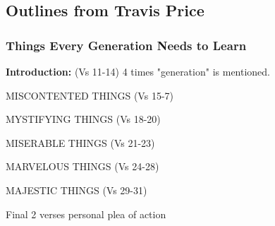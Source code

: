 \subsection{Outlines from Travis Price}


\subsubsection{Things Every Generation Needs to Learn}


\noindent  \textbf{Introduction: } (Vs 11-14) 4 times "generation" is mentioned.\\

\begin{compactenum}[I.]
    \item MISCONTENTED THINGS (Vs 15-7)
    \item MYSTIFYING THINGS (Vs 18-20)
    \item MISERABLE THINGS (Vs 21-23)
    \item MARVELOUS THINGS (Vs 24-28)
    \item MAJESTIC THINGS (Vs 29-31)\\
\end{compactenum}
Final 2 verses personal plea of action




